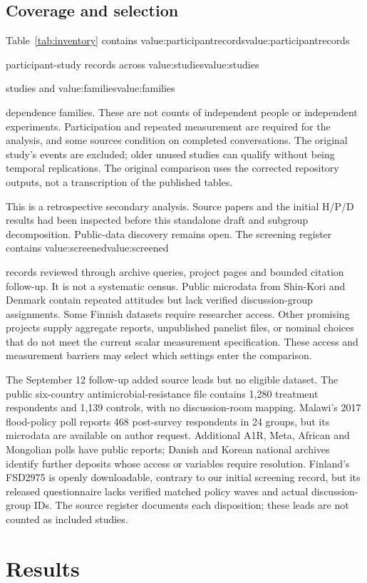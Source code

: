 \documentclass[11pt]{article}
\newcommand{\valueof}[1]{\ifcsname value:#1\endcsname\csname value:#1\endcsname\else\PackageError{oos}{Missing generated value #1}{Run make oos-paper}\fi}
\begin{document}
\subsection{Coverage and selection}
Table~\ref{tab:inventory} contains \valueof{participantrecords} participant-study
records across \valueof{studies} studies and \valueof{families} dependence families.
These are not counts of independent people or independent experiments. Participation
and repeated measurement are required for the analysis, and some sources condition
on completed conversations. The original study's events are excluded; older unused
studies can qualify without being temporal replications. The original comparison
uses the corrected repository outputs, not a transcription of the published tables.

This is a retrospective secondary analysis. Source papers and the initial H/P/D
results had been inspected before this standalone draft and subgroup decomposition.
Public-data discovery remains open. The screening register contains
\valueof{screened} records reviewed through archive queries, project pages and
bounded citation follow-up. It is not a systematic census. Public microdata from
Shin-Kori and Denmark contain repeated attitudes but lack verified discussion-group
assignments. Some Finnish datasets require researcher access. Other promising
projects supply aggregate reports, unpublished panelist files, or nominal choices
that do not meet the current scalar measurement specification. These access and
measurement barriers may select which settings enter the comparison.

The September 12 follow-up added source leads but no eligible dataset. The public
six-country antimicrobial-resistance file contains 1,280 treatment respondents and
1,139 controls, with no discussion-room mapping. Malawi's 2017 flood-policy poll
reports 468 post-survey respondents in 24 groups, but its microdata are available
on author request. Additional A1R, Meta, African and Mongolian polls have public
reports; Danish and Korean national archives identify further deposits whose
access or variables require resolution. Finland's FSD2975 is openly downloadable,
contrary to our initial screening record, but its released questionnaire lacks
verified matched policy waves and actual discussion-group IDs. The source register
documents each disposition; these leads are not counted as included studies.

\section{Results}
\end{document}
